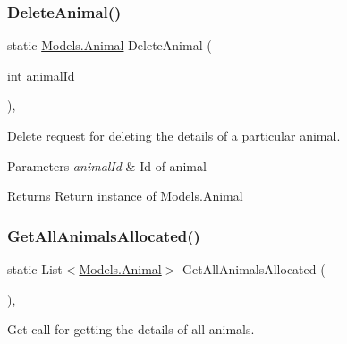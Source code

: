 \subsubsection{\texorpdfstring{Delete\+Animal()}{DeleteAnimal()}}
{\footnotesize\ttfamily static \hyperlink{classWildlifeTrackingApp_1_1Models_1_1Animal}{Models.\+Animal} Delete\+Animal (\begin{DoxyParamCaption}\item[{int}]{animal\+Id }\end{DoxyParamCaption})\hspace{0.3cm}{\ttfamily [inline]}, {\ttfamily [static]}}



Delete request for deleting the details of a particular animal. 


\begin{DoxyParams}{Parameters}
{\em animal\+Id} & Id of animal\\
\hline
\end{DoxyParams}
\begin{DoxyReturn}{Returns}
Return instance of \hyperlink{classWildlifeTrackingApp_1_1Models_1_1Animal}{Models.\+Animal}
\end{DoxyReturn}
\mbox{\label{classWildlifeTrackingApp_1_1Delegates_1_1AnimalDelegate_acdcd9b138229c5e197e45cdad4025bad}} 
\subsubsection{\texorpdfstring{Get\+All\+Animals\+Allocated()}{GetAllAnimalsAllocated()}}
{\footnotesize\ttfamily static List$<$\hyperlink{classWildlifeTrackingApp_1_1Models_1_1Animal}{Models.\+Animal}$>$ Get\+All\+Animals\+Allocated (\begin{DoxyParamCaption}{ }\end{DoxyParamCaption})\hspace{0.3cm}{\ttfamily [inline]}, {\ttfamily [static]}}



Get call for getting the details of all animals. 

